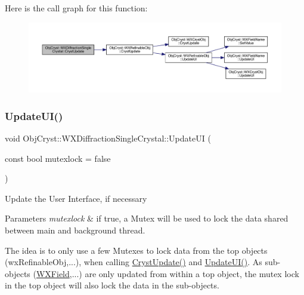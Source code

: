 Here is the call graph for this function\+:
\nopagebreak
\begin{figure}[H]
\begin{center}
\leavevmode
\includegraphics[width=350pt]{class_obj_cryst_1_1_w_x_diffraction_single_crystal_aa66e0abac5c2e4e24ccb1c982548bd4c_cgraph}
\end{center}
\end{figure}
\mbox{\label{class_obj_cryst_1_1_w_x_diffraction_single_crystal_a2b8ef5fa0663d1526258a17498e9b0fc}} 
\subsubsection{\texorpdfstring{UpdateUI()}{UpdateUI()}}
{\footnotesize\ttfamily void Obj\+Cryst\+::\+W\+X\+Diffraction\+Single\+Crystal\+::\+Update\+UI (\begin{DoxyParamCaption}\item[{const bool}]{mutexlock = {\ttfamily false} }\end{DoxyParamCaption})\hspace{0.3cm}{\ttfamily [virtual]}}

Update the User Interface, if necessary


\begin{DoxyParams}{Parameters}
{\em mutexlock} & if true, a Mutex will be used to lock the data shared between main and background thread.\\
\hline
\end{DoxyParams}
The idea is to only use a few Mutexes to lock data from the top objects (wx\+Refinable\+Obj,...), when calling \mbox{\hyperlink{class_obj_cryst_1_1_w_x_diffraction_single_crystal_aa66e0abac5c2e4e24ccb1c982548bd4c}{Cryst\+Update()}} and \mbox{\hyperlink{class_obj_cryst_1_1_w_x_diffraction_single_crystal_a2b8ef5fa0663d1526258a17498e9b0fc}{Update\+U\+I()}}. As sub-\/objects (\mbox{\hyperlink{class_obj_cryst_1_1_w_x_field}{W\+X\+Field}},...) are only updated from within a top object, the mutex lock in the top object will also lock the data in the sub-\/objects. 

